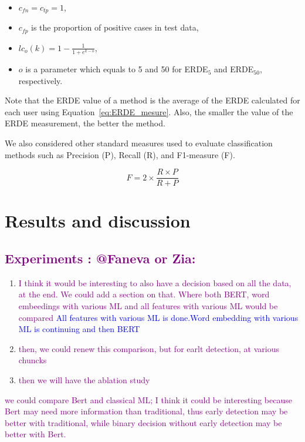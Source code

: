 \documentclass[graybox]{svmult}
\newcommand{\jm}[1]{\textcolor{purple}{{  #1}}}
\newcommand{\zu}[1]{\textcolor{blue}{{#1}}}
\begin{document}
\begin{itemize}
	\item $c_{fn} = c_{tp} = 1$,
	\item $c_{fp}$ is the proportion of positive cases in test data,
	\item $lc_{o}(k) = 1 - \frac{1}{1+e^{k-o}}$,
	\item $o$ is a parameter which equals to 5 and 50 for ERDE$_{5}$ and ERDE$_{50}$, respectively.
\end{itemize}

Note that the ERDE value of a method is the average of the ERDE calculated for each user using Equation~\ref{eq:ERDE_mesure}. Also, the smaller the value of the ERDE measurement, the better the method.

We also considered other standard measures used to evaluate classification methods such as Precision (P), Recall (R), and F1-measure (F). 

\begin{equation}
    F = 2 \times \frac{R \times P}{R + P}
\end{equation}


\section{Results and discussion}

\jm{\subsection{Experiments : @Faneva or Zia:}}
\begin{enumerate}
  
    \item \jm{ I think it would be interesting to also have a decision based on all the data, at the end. We could add a section on that. Where both BERT, word embeedings with various ML and all features with various ML would be compared} \zu{All features with various ML is done.}\zu{Word embedding with various ML is continuing and then BERT}
    \item \jm{then, we could renew this comparison, but for earlt detection, at various chuncks}
    \item \jm{then we will have the ablation study}
\end{enumerate}

\jm{we could compare Bert and classical ML; I think it could be interesting because Bert may need more information than traditional, thus early detection may be better with traditional, while binary decision without early detection may be better with Bert. }
\end{document}
